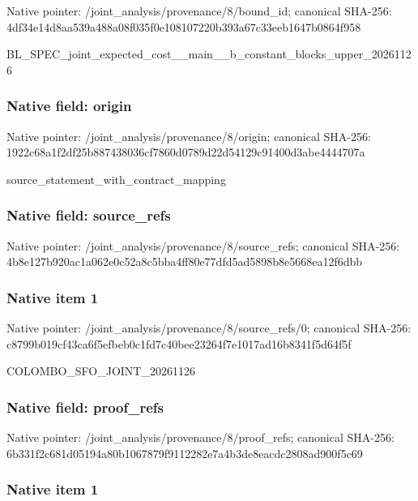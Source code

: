 \documentclass[10pt,a4paper]{article}
\begin{document}
Native pointer: /joint\_analysis/provenance/8/bound\_id; canonical SHA-256: 4df34e14d8aa539a488a08f0\allowbreak{}35f0e108107220b393a67c33\allowbreak{}eeb1647b0864f958


BL\_SPEC\_joint\_expected\_c\allowbreak{}ost\_\_main\_\_b\_constant\_bl\allowbreak{}ocks\_upper\_20261126


\subsubsection{Native field: origin}


Native pointer: /joint\_analysis/provenance/8/origin; canonical SHA-256: 1922c68a1f2df25b88743803\allowbreak{}6cf7860d0789d22d54129c91\allowbreak{}400d3abe4444707a


source\_statement\_with\_contract\_mapping


\subsubsection{Native field: source\_refs}


Native pointer: /joint\_analysis/provenan\allowbreak{}ce/8/source\_refs; canonical SHA-256: 4b8e127b920ac1a062e0c52a\allowbreak{}8c5bba4ff80e77dfd5ad5898\allowbreak{}b8e5668ea12f6dbb



\subsubsection{Native item 1}


Native pointer: /joint\_analysis/provenan\allowbreak{}ce/8/source\_refs/0; canonical SHA-256: c8799b019cf43ca6f5efbeb0\allowbreak{}c1fd7c40bee23264f7e1017a\allowbreak{}d16b8341f5d64f5f


COLOMBO\_SFO\_JOINT\_20261126


\subsubsection{Native field: proof\_refs}


Native pointer: /joint\_analysis/provenance/8/proof\_refs; canonical SHA-256: 6b331f2c681d05194a80b106\allowbreak{}7879f9112282e7a4b3de8eac\allowbreak{}dc2808ad900f5c69



\subsubsection{Native item 1}
\end{document}
